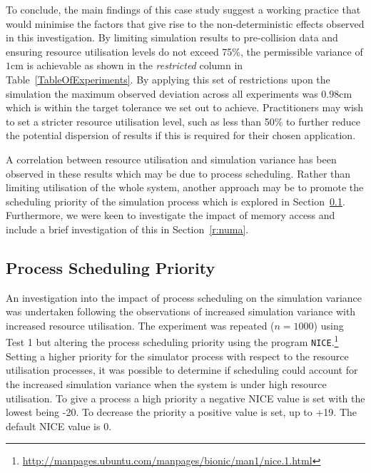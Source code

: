 To conclude, the main findings of this case study suggest a working practice that would minimise the factors that give rise to the non-deterministic effects observed in this investigation. By limiting simulation results to pre-collision data and ensuring resource utilisation levels do not exceed 75\%, the permissible variance of $1$cm is achievable as shown in the \textit{restricted} column in Table~\ref{TableOfExperiments}. By applying this set of restrictions upon the simulation the maximum observed deviation across all experiments was $0.98$cm which is within the target tolerance we set out to achieve. 
%
Practitioners may wish to set a stricter resource utilisation level, such as less than 50\% to further reduce the potential dispersion of results if this is required for their chosen application. 

A correlation between resource utilisation and simulation variance has been observed in these results which may be due to process scheduling. Rather than limiting utilisation of the whole system, another approach may be to promote the scheduling priority of the simulation process which is explored in Section~\ref{r:process_scheduling}. Furthermore, we were keen to investigate the impact of memory access and include a brief investigation of this in Section~\ref{r:numa}. 

\subsection{Process Scheduling Priority} \label{r:process_scheduling}


An investigation into the impact of process scheduling on the simulation variance was undertaken following the observations of increased simulation variance with increased resource utilisation. The experiment was repeated ($n=1000$) using Test 1 but altering the process scheduling priority using the program \texttt{NICE}.\footnote{\url{http://manpages.ubuntu.com/manpages/bionic/man1/nice.1.html}} Setting a higher priority for the simulator process with respect to the resource utilisation processes, it was possible to determine if scheduling could account for the increased simulation variance when the system is under high resource utilisation.
%
To give a process a high priority a negative NICE value is set with the lowest being -20. To decrease the priority a positive value is set, up to +19. The default NICE value is 0.


